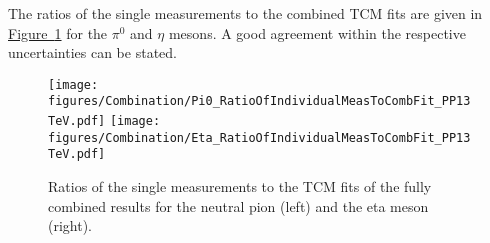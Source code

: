 %
 The ratios of the single measurements to the combined TCM fits are given in \hyperref[fig:SingleRatiosToCombine]{Figure~\ref*{fig:SingleRatiosToCombine}} for the $\pi^0$ and $\eta$ mesons. A good agreement within the respective uncertainties can be stated.
%
 		\begin{figure}[h]
 		\centering
 			\texttt{[image: figures/Combination/Pi0\_RatioOfIndividualMeasToCombFit\_PP13TeV.pdf]}
 			\texttt{[image: figures/Combination/Eta\_RatioOfIndividualMeasToCombFit\_PP13TeV.pdf]}
 			\caption{Ratios of the single measurements to the \acs{TCM} fits of the fully combined results for the neutral pion (left) and the eta meson (right).}
 			\label{fig:SingleRatiosToCombine}
 		\end{figure}

